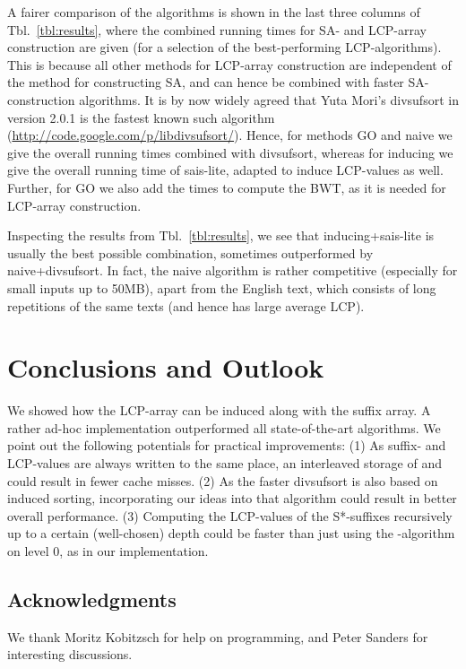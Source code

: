 \documentclass[11pt,onecolumn,final]{article} \usepackage[latin1]{inputenc}
\theoremstyle{plain}
\theoremstyle{remark}
\begin{document}
A fairer comparison of the algorithms is shown in the last three columns of Tbl.~\ref{tbl:results}, where the combined running times for SA- and LCP-array construction are given (for a selection of the best-performing LCP-algorithms). This is because all other methods for LCP-array construction are independent of the method for constructing SA, and can hence be combined with faster SA-construction algorithms. It is by now widely agreed that Yuta Mori's \textsf{divsufsort} in version 2.0.1 is the fastest known such algorithm (\url{http://code.google.com/p/libdivsufsort/}). Hence, for methods \textsf{GO} and \textsf{naive} we give the overall running times combined with \textsf{divsufsort}, whereas for \textsf{inducing} we give the overall running time of \textsf{sais-lite}, adapted to induce LCP-values as well. Further, for \textsf{GO} we also add the times to compute the BWT, as it is needed for LCP-array construction.

Inspecting the results from Tbl.~\ref{tbl:results}, we see that \textsf{inducing}+\textsf{sais-lite} is usually the best possible combination, sometimes outperformed by \textsf{naive}+\textsf{divsufsort}. In fact, the naive algorithm is rather competitive (especially for small inputs up to 50MB), apart from the English text, which consists of long repetitions of the same texts (and hence has large average LCP).

\section{Conclusions and Outlook}
We showed how the LCP-array can be induced along with the suffix array. A rather ad-hoc implementation outperformed all state-of-the-art algorithms. We point out the following potentials for practical improvements: (1) As suffix- and LCP-values are always written to the same place, an interleaved storage of  and  could result in fewer cache misses. (2) As the faster \textsf{divsufsort} is also based on induced sorting, incorporating our ideas into that algorithm could result in better overall performance. (3) Computing the LCP-values of the S*-suffixes recursively up to a certain (well-chosen) depth could be faster than just using the -algorithm on level 0, as in our implementation.

\subsection*{Acknowledgments}
We thank Moritz Kobitzsch for help on programming, and Peter Sanders for interesting discussions.



\end{document}
